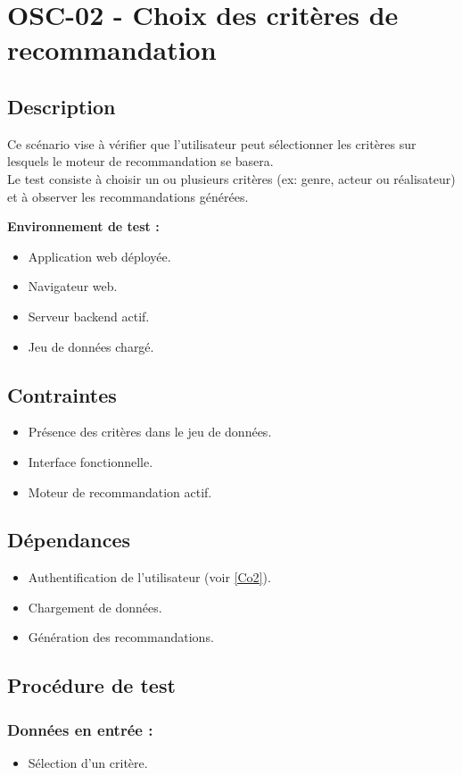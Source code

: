 \documentclass[a4paper,12pt]{report}
\begin{document}
\newpage

\section{OSC-02 - Choix des critères de recommandation}
\label{Rec3}
\subsection*{Description }
Ce scénario vise à vérifier que l'utilisateur peut sélectionner les critères sur lesquels le moteur de recommandation se basera.\\
Le test consiste à choisir un ou plusieurs critères (ex: genre, acteur ou réalisateur) et à observer les recommandations générées.

\textbf{Environnement de test :}
\begin{itemize}
    \item Application web déployée.
    \item Navigateur web.
    \item Serveur backend actif.
    \item Jeu de données chargé.
\end{itemize}
\subsection*{Contraintes}
\begin{itemize}
    \item Présence des critères dans le jeu de données.
    \item Interface fonctionnelle.
    \item Moteur de recommandation actif.
\end{itemize}
\subsection*{Dépendances}
\begin{itemize}
    \item Authentification de l'utilisateur (voir \ref{Co2}).
    \item Chargement de données.
    \item Génération des recommandations.
\end{itemize}
\subsection*{Procédure de test}
\subsubsection{Données en entrée :}
\begin{itemize}
    \item Sélection d'un critère.
\end{itemize}
\end{document}

